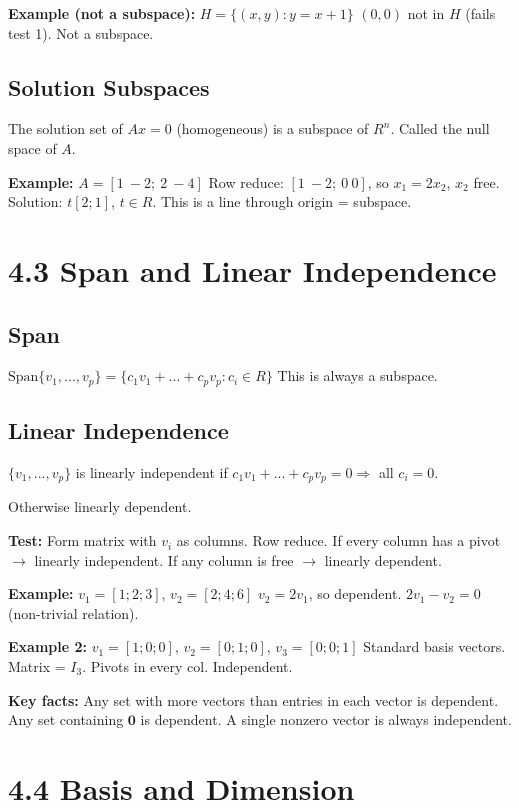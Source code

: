 \textbf{Example (not a subspace):} $H = \{(x,y): y = x+1\}$
$(0,0)$ not in $H$ (fails test 1). Not a subspace.

\subsection{Solution Subspaces}
The solution set of $Ax = 0$ (homogeneous) is a subspace of $R^n$.
Called the null space of $A$.

\textbf{Example:} $A = [1\ -2;\ 2\ -4]$
Row reduce: $[1\ -2;\ 0\ 0]$, so $x_1 = 2x_2$, $x_2$ free.
Solution: $t[2; 1]$, $t \in R$. This is a line through origin = subspace.

\section{4.3 Span and Linear Independence}

\subsection{Span}
$\text{Span}\{v_1, ..., v_p\} = \{c_1 v_1 + ... + c_p v_p : c_i \in R\}$
This is always a subspace.

\subsection{Linear Independence}
$\{v_1, ..., v_p\}$ is linearly independent if
$c_1 v_1 + ... + c_p v_p = 0 \Rightarrow$ all $c_i = 0$.

Otherwise linearly dependent.

\textbf{Test:} Form matrix with $v_i$ as columns. Row reduce.
If every column has a pivot $\to$ linearly independent.
If any column is free $\to$ linearly dependent.

\textbf{Example:} $v_1 = [1;2;3]$, $v_2 = [2;4;6]$
$v_2 = 2v_1$, so dependent. $2v_1 - v_2 = 0$ (non-trivial relation).

\textbf{Example 2:} $v_1 = [1;0;0]$, $v_2 = [0;1;0]$, $v_3 = [0;0;1]$
Standard basis vectors. Matrix = $I_3$. Pivots in every col. Independent.

\textbf{Key facts:}
Any set with more vectors than entries in each vector is dependent.
Any set containing $\mathbf{0}$ is dependent.
A single nonzero vector is always independent.

\section{4.4 Basis and Dimension}

